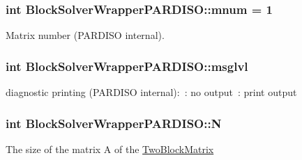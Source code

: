 \subsubsection[{\texorpdfstring{mnum}{mnum}}]{\setlength{\rightskip}{0pt plus 5cm}int Block\+Solver\+Wrapper\+P\+A\+R\+D\+I\+S\+O\+::mnum = 1\hspace{0.3cm}{\ttfamily [private]}}\hypertarget{class_block_solver_wrapper_p_a_r_d_i_s_o_ae7c0c78a1167861fcce71bc86bddba19}{}\label{class_block_solver_wrapper_p_a_r_d_i_s_o_ae7c0c78a1167861fcce71bc86bddba19}
Matrix number (P\+A\+R\+D\+I\+SO internal). 
\subsubsection[{\texorpdfstring{msglvl}{msglvl}}]{\setlength{\rightskip}{0pt plus 5cm}int Block\+Solver\+Wrapper\+P\+A\+R\+D\+I\+S\+O\+::msglvl\hspace{0.3cm}{\ttfamily [private]}}\hypertarget{class_block_solver_wrapper_p_a_r_d_i_s_o_a547f7dbd1fa0da9ce546a707d4e19912}{}\label{class_block_solver_wrapper_p_a_r_d_i_s_o_a547f7dbd1fa0da9ce546a707d4e19912}
diagnostic printing (P\+A\+R\+D\+I\+SO internal)\+:~\+: no output~\+: print output 
\subsubsection[{\texorpdfstring{N}{N}}]{\setlength{\rightskip}{0pt plus 5cm}int Block\+Solver\+Wrapper\+P\+A\+R\+D\+I\+S\+O\+::N\hspace{0.3cm}{\ttfamily [private]}}\hypertarget{class_block_solver_wrapper_p_a_r_d_i_s_o_a0218d17deabfb2a7b8905b90ccb6ef46}{}\label{class_block_solver_wrapper_p_a_r_d_i_s_o_a0218d17deabfb2a7b8905b90ccb6ef46}
The size of the matrix A of the \hyperlink{class_two_block_matrix}{Two\+Block\+Matrix} 
